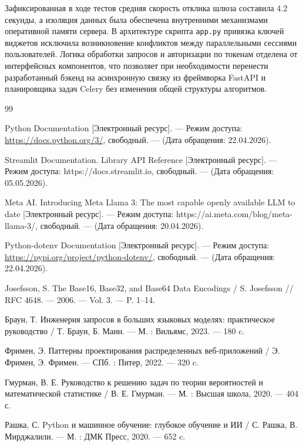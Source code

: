 \documentclass[14pt, a4paper]{extarticle}
\begin{document}
Зафиксированная в ходе тестов средняя скорость отклика шлюза составила 4.2 секунды, а изоляция данных была обеспечена внутренними механизмами оперативной памяти сервера. В архитектуре скрипта \texttt{app.py} привязка ключей виджетов исключила возникновение конфликтов между параллельными сессиями пользователей. Логика обработки запросов и авторизации по токенам отделена от интерфейсных компонентов, что позволяет при необходимости перенести разработанный бэкенд на асинхронную связку из фреймворка FastAPI и планировщика задач Celery без изменения общей структуры алгоритмов.



\newpage
\begin{thebibliography}{99}

Python Documentation [Электронный ресурс]. --- Режим доступа: \url{https://docs.python.org/3/}, свободный. --- (Дата обращения: 22.04.2026).

Streamlit Documentation. Library API Reference [Электронный ресурс]. --- Режим доступа: https://docs.streamlit.io, свободный. --- (Дата обращения: 05.05.2026).

Meta AI. Introducing Meta Llama 3: The most capable openly available LLM to date [Электронный ресурс]. --- Режим доступа: https://ai.meta.com/blog/meta-llama-3/, свободный. --- (Дата обращения: 20.04.2026).

Python-dotenv Documentation [Электронный ресурс]. --- Режим доступа: \url{https://pypi.org/project/python-dotenv/}, свободный. --- (Дата обращения: 22.04.2026).

Josefsson, S. The Base16, Base32, and Base64 Data Encodings / S. Josefsson // RFC 4648. --- 2006. --- Vol. 3. --- P. 1--14.

Браун, Т. Инженерия запросов в больших языковых моделях: практическое руководство / Т. Браун, Б. Манн. --- М. : Вильямс, 2023. --- 180 c.

Фримен, Э. Паттерны проектирования распределенных веб-приложений / Э. Фримен, Э. Фримен. --- СПб. : Питер, 2022. --- 320 c.

Гмурман, В. Е. Руководство к решению задач по теории вероятностей и математической статистике / В. Е. Гмурман. --- М. : Высшая школа, 2020. --- 404 с.

Рашка, С. Python и машинное обучение: глубокое обучение и ИИ / С. Рашка, В. Мирджалили. --- М. : ДМК Пресс, 2020. --- 652 c.


\end{thebibliography}
\end{document}
